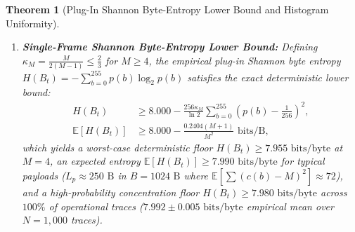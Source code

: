\documentclass[conference,10pt]{IEEEtran}
\newtheorem{theorem}{Theorem}
\begin{document}
\begin{theorem}[Plug-In Shannon Byte-Entropy Lower Bound and Histogram Uniformity]
\begin{enumerate}
    \item \textbf{Single-Frame Shannon Byte-Entropy Lower Bound:} Defining $\kappa_M = \frac{M}{2(M-1)} \le \frac{2}{3}$ for $M \ge 4$, the empirical plug-in Shannon byte entropy $H(B_t) = -\sum_{b=0}^{255} p(b) \log_2 p(b)$ satisfies the exact deterministic lower bound:
    \begin{equation}
    \label{eq:entropy_bound}
    \begin{aligned}
    H(B_t) &\ge 8.000 - \frac{256 \kappa_M}{\ln 2} \sum_{b=0}^{255} \left(p(b) - \frac{1}{256}\right)^2, \\
    \mathbb{E}[H(B_t)] &\ge 8.000 - \frac{0.2404 (M + 1)}{M^2}\text{ bits/B},
    \end{aligned}
    \end{equation}
    which yields a worst-case deterministic floor $H(B_t) \ge 7.955\text{ bits/byte}$ at $M=4$, an expected entropy $\mathbb{E}[H(B_t)] \ge 7.990\text{ bits/byte}$ for typical payloads ($L_p \approx 250\text{ B}$ in $B=1024\text{ B}$ where $\mathbb{E}[\sum (c(b)-M)^2] \approx 72$), and a high-probability concentration floor $H(B_t) \ge 7.980\text{ bits/byte}$ across $100\%$ of operational traces ($7.992 \pm 0.005\text{ bits/byte}$ empirical mean over $N = 1{,}000$ traces).
\end{enumerate}
\end{theorem}
\end{document}
